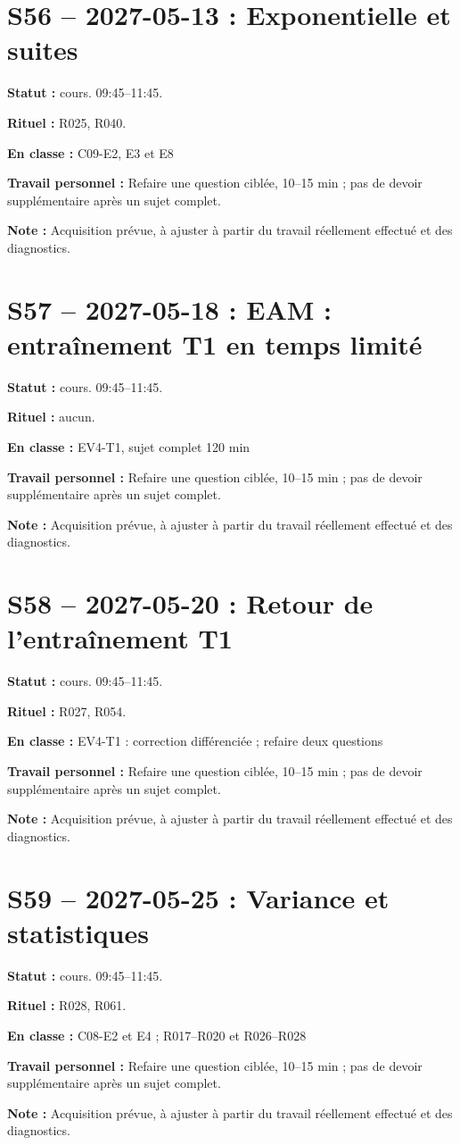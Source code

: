 \section*{S56 -- 2027-05-13 : Exponentielle et suites}
\textbf{Statut :} cours. 09:45–11:45.\par\textbf{Rituel :} R025, R040.\par\textbf{En classe :} C09-E2, E3 et E8\par\textbf{Travail personnel :} Refaire une question ciblée, 10–15 min ; pas de devoir supplémentaire après un sujet complet.\par\textbf{Note :} Acquisition prévue, à ajuster à partir du travail réellement effectué et des diagnostics.
\section*{S57 -- 2027-05-18 : EAM : entraînement T1 en temps limité}
\textbf{Statut :} cours. 09:45–11:45.\par\textbf{Rituel :} aucun.\par\textbf{En classe :} EV4-T1, sujet complet 120 min\par\textbf{Travail personnel :} Refaire une question ciblée, 10–15 min ; pas de devoir supplémentaire après un sujet complet.\par\textbf{Note :} Acquisition prévue, à ajuster à partir du travail réellement effectué et des diagnostics.
\section*{S58 -- 2027-05-20 : Retour de l’entraînement T1}
\textbf{Statut :} cours. 09:45–11:45.\par\textbf{Rituel :} R027, R054.\par\textbf{En classe :} EV4-T1 : correction différenciée ; refaire deux questions\par\textbf{Travail personnel :} Refaire une question ciblée, 10–15 min ; pas de devoir supplémentaire après un sujet complet.\par\textbf{Note :} Acquisition prévue, à ajuster à partir du travail réellement effectué et des diagnostics.
\section*{S59 -- 2027-05-25 : Variance et statistiques}
\textbf{Statut :} cours. 09:45–11:45.\par\textbf{Rituel :} R028, R061.\par\textbf{En classe :} C08-E2 et E4 ; R017–R020 et R026–R028\par\textbf{Travail personnel :} Refaire une question ciblée, 10–15 min ; pas de devoir supplémentaire après un sujet complet.\par\textbf{Note :} Acquisition prévue, à ajuster à partir du travail réellement effectué et des diagnostics.
